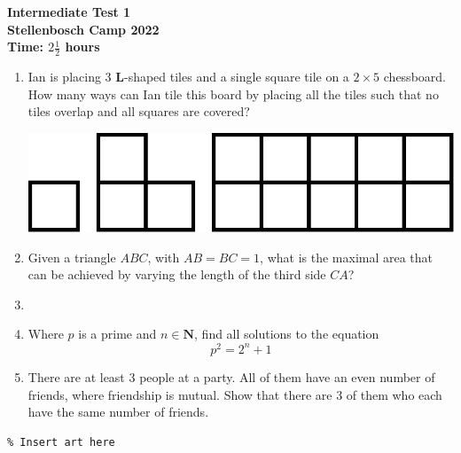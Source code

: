 \documentclass{article}
\begin{document}
\thispagestyle{empty}

\begin{center}
  \textbf{\Large Intermediate Test 1}
  \\ \vspace{1em}
  \textbf{\large Stellenbosch Camp 2022}
  \\ \vspace{1em}
  \textbf{\large Time: $2\frac{1}{2}$ hours}
\end{center}

\bigskip

\begin{enumerate}[itemsep=\fill]

\item %
Ian is placing $3$ $\mathbf{L}$-shaped tiles and a single square tile on a $2\times5$ chessboard. How many ways can Ian tile this board by placing all the tiles such that no tiles overlap and all squares are covered?
\begin{center}
    \includegraphics[scale=0.3]{intermediate_Q1_shapes.png}
\end{center}

\item %

Given a triangle $ABC$, with $AB = BC = 1$, what is the maximal area that can be achieved by varying the length of the third side $CA$?

\item %


\item %
Where $p$ is a prime and $n\in\mathbf{N}$, find all solutions to the equation \[p^2 = 2^n + 1\]

\item %
There are at least 3 people at a party. All of them have an even number of friends, where friendship is mutual. Show that there are 3 of them who each have the same number of friends.

\end{enumerate}


\centering
\small
\begin{BVerbatim}
% Insert art here
\end{BVerbatim}
\end{document}
